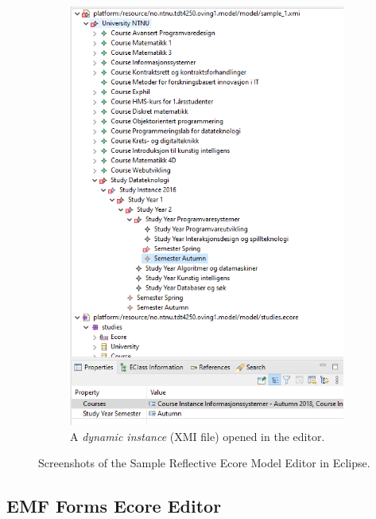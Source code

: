 \begin{figure}
\begin{subfigure}[b]{.45\textwidth}
        \includegraphics[width=\textwidth]{figures/pre-project/ecore-sample-reflective-ecore-model-editor-instance.png}
        \caption{A \emph{dynamic instance} (\acrshort{XMI} file) opened in the editor.}\label{sfig:sample-reflective-ecore-model-instance-screenshot}
    \end{subfigure}
    \caption{Screenshots of the Sample Reflective Ecore Model Editor in \gls{Eclipse}.}\label{fig:sample-reflective-ecore-model}
\end{figure}


\subsection{EMF Forms Ecore Editor}\label{sec:emfforms-editor}

